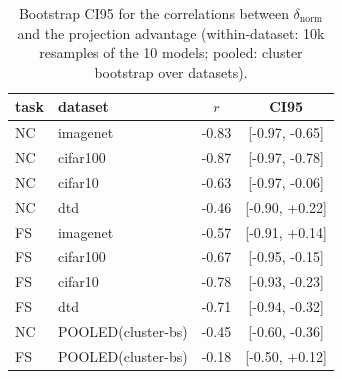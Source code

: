 \begin{table}[H]
\centering
\small
\begin{tabular}{llcc}
\toprule
task & dataset & $r$ & CI95 \\
\midrule
NC & imagenet & -0.83 & [-0.97, -0.65] \\
NC & cifar100 & -0.87 & [-0.97, -0.78] \\
NC & cifar10 & -0.63 & [-0.97, -0.06] \\
NC & dtd & -0.46 & [-0.90, +0.22] \\
FS & imagenet & -0.57 & [-0.91, +0.14] \\
FS & cifar100 & -0.67 & [-0.95, -0.15] \\
FS & cifar10 & -0.78 & [-0.93, -0.23] \\
FS & dtd & -0.71 & [-0.94, -0.32] \\
NC & POOLED(cluster-bs) & -0.45 & [-0.60, -0.36] \\
FS & POOLED(cluster-bs) & -0.18 & [-0.50, +0.12] \\
\bottomrule
\end{tabular}
\caption{Bootstrap CI95 for the correlations between $\delta_{\text{norm}}$ and the projection advantage (within-dataset: 10k resamples of the 10 models; pooled: cluster bootstrap over datasets).}
\label{tab:b5-cis}
\end{table}
